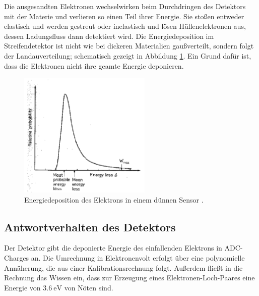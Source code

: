 Die ausgesandten Elektronen wechselwirken beim Durchdringen des Detektors mit der Materie und verlieren so einen Teil ihrer Energie.
Sie stoßen entweder elastisch und werden gestreut oder inelastisch und lösen Hüllenelektronen aus, dessen Ladungsfluss dann detektiert wird.
Die Energiedeposition im Streifendetektor ist nicht wie bei dickeren Materialien gaußverteilt, sondern folgt der Landauverteilung; schematisch gezeigt in Abbildung \ref{fig:energiedepositionElektron}. Ein Grund dafür ist, dass die Elektronen nicht ihre geamte Energie deponieren.
\begin{figure}
  \centering
  \includegraphics[height=6cm]{TimosAufrisse/energiedepositionElektron.png}
  \caption{Energiedeposition des Elektrons in einem dünnen Sensor \cite{anleitung}.}
  \label{fig:energiedepositionElektron}
\end{figure}

\subsection{Antwortverhalten des Detektors}

Der Detektor gibt die deponierte Energie des einfallenden Elektrons in ADC-Charges an. Die Umrechnung in Elektronenvolt erfolgt über eine polynomielle Annäherung, die aus einer Kalibrationsrechnung folgt. Außerdem fließt in die Rechnung das Wissen ein, dass zur Erzeugung eines Elektronen-Loch-Paares eine Energie von $\SI{3.6}{\electronvolt}$ von Nöten sind.

